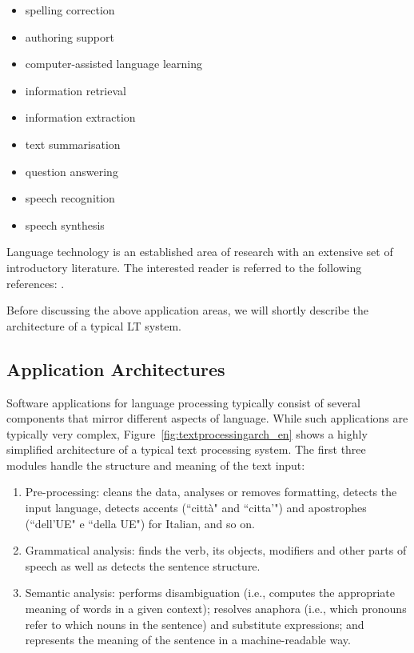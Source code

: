 \documentclass[]{../../metanetpaper}
\begin{document}
\begin{multicols}{2}
\begin{itemize}
\item spelling correction
\item authoring support
\item computer-assisted language learning
\item information retrieval 
\item information extraction
\item text summarisation
\item question answering
\item speech recognition 
\item speech synthesis 
\end{itemize}


Language technology is an established area of research with an extensive set
of introductory literature. The interested reader is referred to the following
references:  \cite{carstensen-etal1, jurafsky-martin01, manning-schuetze1,
  lt-world1, lt-survey1}.


Before discussing the above application areas, we will shortly describe the
architecture of a typical LT system.



\subsection{Application Architectures}

Software applications for language processing typically consist of several
components that mirror different aspects of language. While such applications
are typically very complex, Figure~\ref{fig:textprocessingarch_en} shows a 
highly simplified architecture of a typical text processing system. The first 
three modules handle the structure and meaning of the text input:

\begin{enumerate}
\item Pre-processing: cleans the data, analyses or removes formatting, detects
  the input language, detects accents (“citt\`{a}" and “citta'") and apostrophes (“dell'UE" e “della UE") for Italian, and so on.
\item Grammatical analysis: finds the verb, its objects, modifiers and other parts of speech as well as detects the sentence structure.
\item Semantic analysis: performs disambiguation (i.e., computes the appropriate meaning of words in a given context); resolves anaphora (i.e., which pronouns refer to which nouns in the sentence) and substitute expressions; and represents the meaning of the sentence in a machine-readable way.
\end{enumerate}


\end{multicols}
\end{document}
